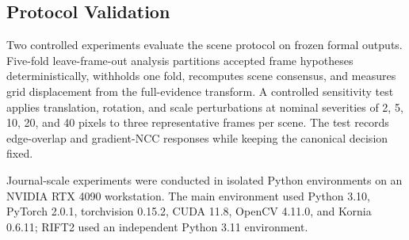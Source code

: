 \subsection{Protocol Validation}

Two controlled experiments evaluate the scene protocol on frozen formal outputs. Five-fold
leave-frame-out analysis partitions accepted frame hypotheses deterministically, withholds one
fold, recomputes scene consensus, and measures grid displacement from the full-evidence transform.
A controlled sensitivity test applies translation, rotation, and scale perturbations at nominal
severities of 2, 5, 10, 20, and 40 pixels to three representative frames per scene. The test
records edge-overlap and gradient-NCC responses while keeping the canonical decision fixed.

Journal-scale experiments were conducted in isolated Python environments on an NVIDIA RTX 4090
workstation. The main environment used Python 3.10, PyTorch 2.0.1, torchvision 0.15.2, CUDA 11.8,
OpenCV 4.11.0, and Kornia 0.6.11; RIFT2 used an independent Python 3.11 environment.
